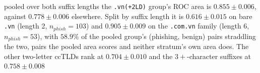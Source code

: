 pooled over both suffix lengths the \texttt{.vn(+2LD)} group's ROC area is $0.855 \pm 0.006$, against $0.778 \pm 0.006$ elsewhere. Split by suffix length it is $0.616 \pm 0.015$ on bare \texttt{.vn} (length 2, $n_{phish}=103$) and $0.905 \pm 0.009$ on the \texttt{.com.vn} family (length 6, $n_{phish}=53$), with $58.9\%$ of the pooled group's (phishing, benign) pairs straddling the two, pairs the pooled area scores and neither stratum's own area does. The other two-letter ccTLDs rank at $0.704 \pm 0.010$ and the $3+$-character suffixes at $0.758 \pm 0.008$%
